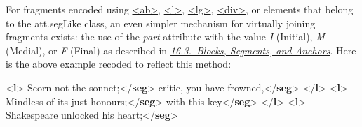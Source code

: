 For fragments encoded using \hyperref[TEI.ab]{<ab>}, \hyperref[TEI.l]{<l>}, \hyperref[TEI.lg]{<lg>}, \hyperref[TEI.div]{<div>}, or elements that belong to the \textsf{att.segLike} class, an even simpler mechanism for virtually joining fragments exists: the use of the {\itshape part} attribute with the value \textit{I} (Initial), \textit{M} (Medial), or \textit{F} (Final) as described in \textit{\hyperref[SASE]{16.3.\ Blocks, Segments, and Anchors}}. Here is the above example recoded to reflect this method: \par\bgroup{}\exampleFont \begin{shaded}\noindent\mbox{}{<\textbf{l}>}\mbox{}\newline 
{}Scorn not the sonnet;{</\textbf{seg}>}\mbox{}\newline 
{}critic, you have frowned,{</\textbf{seg}>}\mbox{}\newline 
{</\textbf{l}>}\mbox{}\newline 
{<\textbf{l}>}\mbox{}\newline 
{}Mindless of its just honours;{</\textbf{seg}>}\mbox{}\newline 
{}with this key{</\textbf{seg}>}\mbox{}\newline 
{</\textbf{l}>}\mbox{}\newline 
{<\textbf{l}>}\mbox{}\newline 
{}Shakespeare unlocked his heart;{</\textbf{seg}>}\mbox{}\newline 

\end{shaded}
